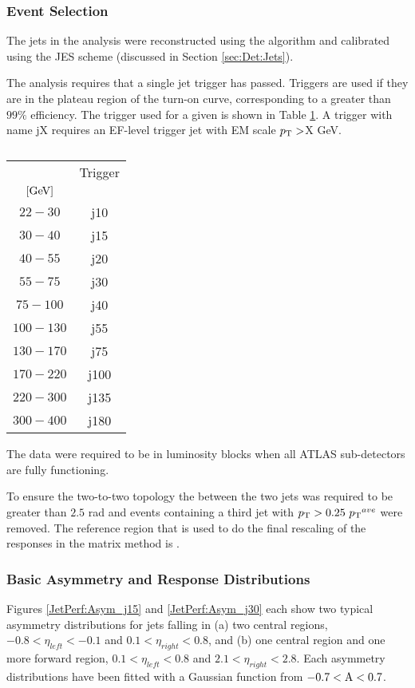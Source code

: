 \subsubsection{Event Selection}

The jets in the analysis were reconstructed using the \antikt{} algorithm and calibrated using the JES scheme (discussed in Section \ref{sec:Det:Jets}).

The analysis requires that a single jet trigger has passed.
Triggers are used if they are in the plateau region of the turn-on curve, corresponding to a greater than $99\%$ efficiency.
The trigger used for a given \ptave{} is shown in Table \ref{JetPerf:Triggers}.
A trigger with name jX requires an EF-level trigger jet with EM scale $\mbox{$p_{\rm T}$}{}>$X GeV.
\begin{table}
\centering
\begin{tabular}{  c c }
\ptave{} & Trigger\\
$[\rm GeV]$ & \\
\hline
$22-30$   & j10 \\
$30-40$   & j15 \\
$40-55$   & j20 \\
$55-75$   & j30 \\
$75-100$  & j40 \\
$100-130$ & j55 \\
$130-170$ & j75 \\
$170-220$ & j100 \\
$220-300$ & j135 \\
$300-400$ & j180 \\
\end{tabular}
\caption[]{
\label{JetPerf:Triggers}}
\end{table}
The data were required to be in luminosity blocks when all ATLAS sub-detectors are fully functioning. 

To ensure the two-to-two topology the \dphi{} between the two jets was required to be greater than $2.5$ rad and events containing a third jet with $\mbox{$p_{\rm T}$}{} >0.25~ \mbox{$\mbox{$p_{\rm T}$}{}^{ave}$}{}$ were removed.
The reference region that is used to do the final rescaling of the responses in the matrix method is .

\subsubsection{Basic Asymmetry and Response Distributions}

Figures \ref{JetPerf:Asym_j15} and \ref{JetPerf:Asym_j30} each show two typical asymmetry distributions for jets falling in (a) two central regions, $-0.8<\eta_{left}<-0.1$ and $0.1<\eta_{right}<0.8$, and (b) one central region and one more forward region, $0.1<\eta_{left}<0.8$ and $2.1<\eta_{right}<2.8$. 
Each asymmetry distributions have been fitted with a Gaussian function from $\rm{-0.7<A<0.7}$.

